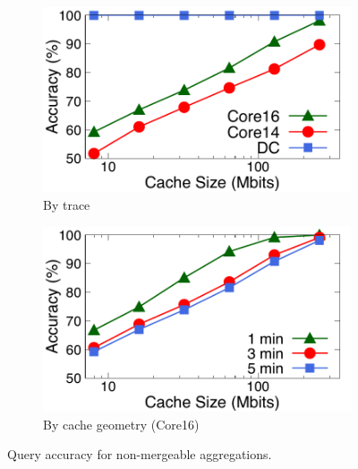 \begin{figure}[ht]
\centering
\vspace{-0.1in}
\begin{subfigure}[t]{0.48\columnwidth}
\raggedright
\includegraphics[width=\linewidth]{pq_accuracy-alltraces.pdf}
\caption{By trace}
\label{fig:accuracy-traces}
\end{subfigure}
\begin{subfigure}[t]{0.48\columnwidth}
\raggedleft
\includegraphics[width=\linewidth]{pq_accuracy-core-geo.pdf}
\caption{By cache geometry (Core16)}
\label{fig:accuracy-time}
\end{subfigure}
\caption{Query accuracy for non-mergeable aggregations.}
\end{figure}
